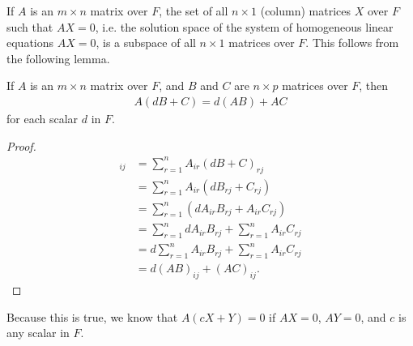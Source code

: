 \documentclass[12pt]{article}
\begin{document}
\begin{exm}
  If $A$ is an $m \times n$ matrix over $F$, the set of all $n \times 1$ (column)
  matrices $X$ over $F$ such that $AX = 0$, i.e. the solution space of the system of
  homogeneous linear equations $AX = 0$, is a subspace of all $n \times 1$ matrices
  over $F$. This follows from the following lemma.

  \begin{nlemma}
    If $A$ is an $m \times n$ matrix over $F$, and $B$ and $C$ are $n \times p$
    matrices over $F$, then
    \begin{align*}
      A(dB + C) = d(AB) + AC
    \end{align*}
    for each scalar $d$ in $F$.

    \begin{proof}
      \begin{align*}
        [A(dB + C)]_{ij} &= \sum_{r = 1}^{n}A_{ir}(dB + C)_{rj}\\
        &= \sum_{r = 1}^{n}A_{ir}(dB_{rj} + C_{rj})\\
        &= \sum_{r = 1}^{n}(dA_{ir}B_{rj} + A_{ir}C_{rj})\\
        &= \sum_{r = 1}^{n}dA_{ir}B_{rj} + \sum_{r = 1}^{n}A_{ir}C_{rj}\\
        &= d\sum_{r = 1}^{n}A_{ir}B_{rj} + \sum_{r = 1}^{n}A_{ir}C_{rj}\\
        &= d(AB)_{ij} + (AC)_{ij}.
      \end{align*}
    \end{proof}
  \end{nlemma}

  Because this is true, we know that $A(cX + Y) = 0$ if $AX = 0$, $AY = 0$, and $c$
  is any scalar in $F$.
\end{exm}
\end{document}
